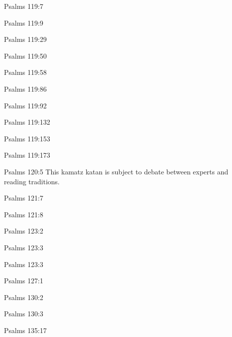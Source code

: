 \documentclass[14pt]{article}
\begin{document}
\begin{itemize}
{{{{{{{{{{{{\item Psalms 119:7

\item Psalms 119:9

\item Psalms 119:29

\item Psalms 119:50

\item Psalms 119:58

\item Psalms 119:86

\item Psalms 119:92

\item Psalms 119:132

\item Psalms 119:153

\item Psalms 119:173

\item Psalms 120:5 This kamatz katan is subject to debate between experts and reading traditions.

\item Psalms 121:7

\item Psalms 121:8

\item Psalms 123:2

\item Psalms 123:3

\item Psalms 123:3

\item Psalms 127:1

\item Psalms 130:2

\item Psalms 130:3

\item Psalms 135:17

}}}}}}}}}}}}
\end{itemize}
\end{document}
